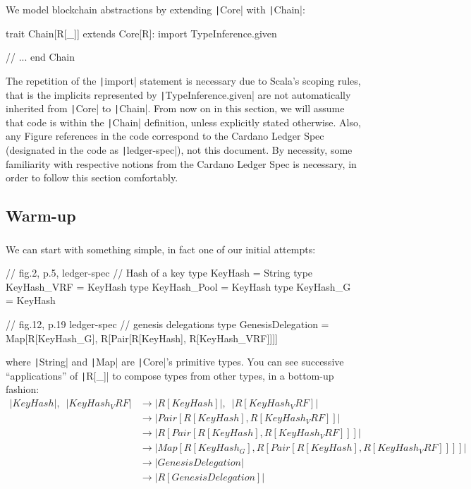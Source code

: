 \documentclass[11pt]{article}
\newcommand{\ScalaI}[1]{\texttt|#1|}
\newcommand{\TextI}[1]{\texttt|#1|}
\begin{document}
We model blockchain abstractions by extending \ScalaI{Core} with \ScalaI{Chain}:

\begin{ScalaBlockSimple}
trait Chain[R[_]] extends Core[R]:
  import TypeInference.given
  
  // ...
end Chain
\end{ScalaBlockSimple}

\noindent The repetition of the \ScalaI{import} statement is necessary due to Scala's scoping rules, that is the implicits represented by \ScalaI{TypeInference.given} are not automatically inherited from \ScalaI{Core} to \ScalaI{Chain}. From now on in this section, we will assume that code is within the \ScalaI{Chain} definition, unless explicitly stated otherwise. Also, any Figure references in the code correspond to the Cardano Ledger Spec (designated in the code as \TextI{ledger-spec}), not this document. By necessity, some familiarity with respective notions from the Cardano Ledger Spec is necessary, in order to follow this section comfortably.

\subsection{Warm-up}
\label{sec:chain:warmup}

\subsubsection*{\fbox{\ScalaI{GenesisDelegation}}}

We can start with something simple, in fact one of our initial attempts:

\begin{ScalaBlockSimple}
  // fig.2, p.5, ledger-spec
  // Hash of a key
  type KeyHash = String
  type KeyHash_VRF  = KeyHash
  type KeyHash_Pool = KeyHash
  type KeyHash_G    = KeyHash
  
  // fig.12, p.19 ledger-spec
  // genesis delegations
  type GenesisDelegation =
    Map[R[KeyHash_G], R[Pair[R[KeyHash], R[KeyHash_VRF]]]]
\end{ScalaBlockSimple}

\noindent where \ScalaI{String} and \ScalaI{Map} are \ScalaI{Core}'s primitive types. You can see successive ``applications'' of \ScalaI{R[_]} to compose types from other types, in a bottom-up fashion:
\begin{align*}
\ScalaI{KeyHash}, \enspace \ScalaI{KeyHash_VRF} 
  & \to \ScalaI{R[KeyHash]}, \enspace \ScalaI{R[KeyHash_VRF]} \\
  & \to \ScalaI{Pair[R[KeyHash], R[KeyHash_VRF]]} \\ 
  & \to \ScalaI{R[Pair[R[KeyHash], R[KeyHash_VRF]]]} \\ 
  & \to \ScalaI{Map[R[KeyHash_G], R[Pair[R[KeyHash], R[KeyHash_VRF]]]]} \\
  & \to \ScalaI{GenesisDelegation} \\
  & \to \ScalaI{R[GenesisDelegation]}
\end{align*}
\end{document}
